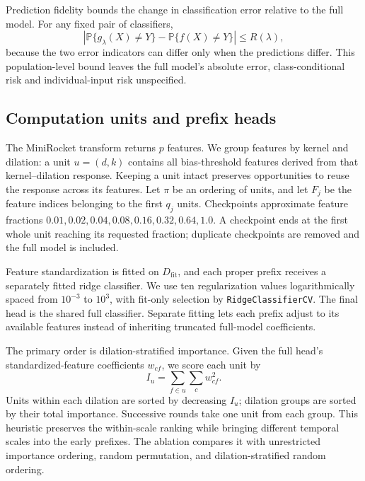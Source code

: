 \documentclass[pdflatex,sn-basic,Numbered]{sn-jnl}
\newcommand{\Prob}{\mathbb{P}}
\begin{document}
Prediction fidelity bounds the change in classification error relative to the full model. For any fixed pair of classifiers,
\begin{equation}
 \left|\Prob\{g_\lambda(X)\ne Y\}-\Prob\{f(X)\ne Y\}\right|
 \le R(\lambda),\label{eq:accuracy}
\end{equation}
because the two error indicators can differ only when the predictions differ. This population-level bound leaves the full model's absolute error, class-conditional risk and individual-input risk unspecified.

\subsection{Computation units and prefix heads}
The MiniRocket transform returns $p$ features. We group features by kernel and dilation: a unit $u=(d,k)$ contains all bias-threshold features derived from that kernel--dilation response. Keeping a unit intact preserves opportunities to reuse the response across its features. Let $\pi$ be an ordering of units, and let $F_j$ be the feature indices belonging to the first $q_j$ units. Checkpoints approximate feature fractions $0.01,0.02,0.04,0.08,0.16,0.32,0.64,1.0$. A checkpoint ends at the first whole unit reaching its requested fraction; duplicate checkpoints are removed and the full model is included.

Feature standardization is fitted on $D_{\mathrm{fit}}$, and each proper prefix receives a separately fitted ridge classifier. We use ten regularization values logarithmically spaced from $10^{-3}$ to $10^3$, with fit-only selection by \texttt{RidgeClassifierCV}. The final head is the shared full classifier. Separate fitting lets each prefix adjust to its available features instead of inheriting truncated full-model coefficients.

The primary order is dilation-stratified importance. Given the full head's standardized-feature coefficients $w_{cf}$, we score each unit by
\begin{equation}
 I_u=\sum_{f\in u}\sum_c w_{cf}^{2}.\label{eq:importance}
\end{equation}
Units within each dilation are sorted by decreasing $I_u$; dilation groups are sorted by their total importance. Successive rounds take one unit from each group. This heuristic preserves the within-scale ranking while bringing different temporal scales into the early prefixes. The ablation compares it with unrestricted importance ordering, random permutation, and dilation-stratified random ordering.
\end{document}
